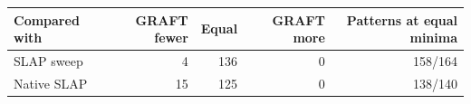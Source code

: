 \begin{tabular}{@{}lrrrr@{}}\toprule
Compared with & GRAFT fewer & Equal & GRAFT more & Patterns at equal minima\\\midrule
SLAP sweep & 4 & 136 & 0 & 158/164\\
Native SLAP & 15 & 125 & 0 & 138/140\\
\bottomrule\end{tabular}
